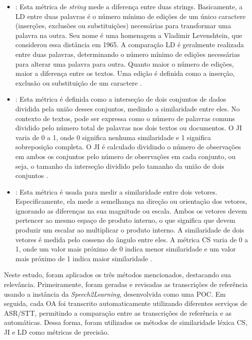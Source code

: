 \begin{itemize}

\item \textbf{}: Esta métrica de \textit{string} mede a diferença entre duas strings. Basicamente, a LD entre duas palavras é o número mínimo de edições de um único caractere (inserções, exclusões ou substituições) necessárias para transformar uma palavra na outra. Seu nome é uma homenagem a Vladimir Levenshtein, que considerou essa distância em 1965. A comparação LD é geralmente realizada entre duas palavras, determinando o número mínimo de edições necessárias para alterar uma palavra para outra. Quanto maior o número de edições, maior a diferença entre os textos. Uma edição é definida como a inserção, exclusão ou substituição de um caractere \cite{levens-1,levens-2}.

\item \textbf{}: Esta métrica é definida como a interseção de dois conjuntos de dados dividida pela união desses conjuntos, medindo a similaridade entre eles. No contexto de textos, pode ser expressa como o número de palavras comuns dividido pelo número total de palavras nos dois textos ou documentos. O JI varia de 0 a 1, onde 0 significa nenhuma similaridade e 1 significa sobreposição completa. O JI é calculado dividindo o número de observações em ambos os conjuntos pelo número de observações em cada conjunto, ou seja, o tamanho da interseção dividido pelo tamanho da união de dois conjuntos \cite{jaccard-1,jaccard-2}.

\item \textbf{}: Esta métrica é usada para medir a similaridade entre dois vetores. Especificamente, ela mede a semelhança na direção ou orientação dos vetores, ignorando as diferenças na sua magnitude ou escala. Ambos os vetores devem pertencer ao mesmo espaço de produto interno, o que significa que devem produzir um escalar ao multiplicar o produto interno. A similaridade de dois vetores é medida pelo cosseno do ângulo entre eles. A métrica CS varia de 0 a 1, onde um valor mais próximo de 0 indica menor similaridade e um valor mais próximo de 1 indica maior similaridade \cite{cosseno-1,cosseno-2,cosseno-3}.

\end{itemize}

Neste estudo, foram aplicados os três métodos mencionados, destacando sua relevância. Primeiramente, foram geradas e revisadas as transcrições de referência usando a instância da \textit{Speech2Learning}, desenvolvida como uma POC. Em seguida, cada OA foi transcrito automaticamente utilizando diferentes serviços de ASR/STT, permitindo a comparação entre as transcrições de referência e as automáticas. Dessa forma, foram utilizados os métodos de similaridade léxica CS, JI e LD como métricas de precisão.

